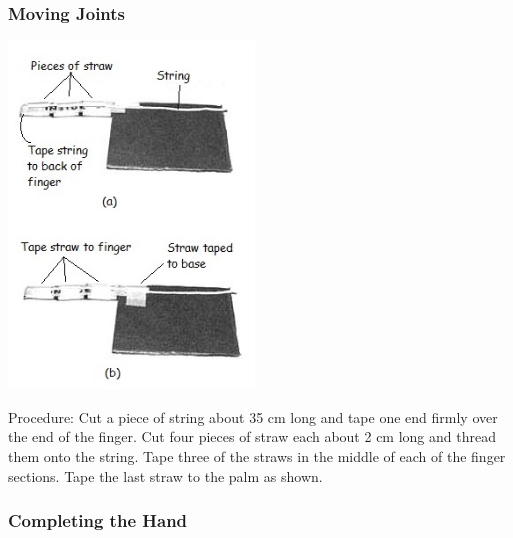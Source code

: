 \begin{multicols}{2}
\columnbreak

\subsubsection{Moving Joints}

\begin{center}
\includegraphics[width=0.49\textwidth]{./img/robotic-hand-4.jpg}
\end{center}

\begin{description*}
\item[Procedure:]{Cut a piece of string about 35 cm long and tape one end firmly over the end of
the finger. Cut four pieces of straw each about 2 cm long and thread them onto the string. Tape three of the straws in the middle of each of the finger sections. Tape the last straw to the palm as shown. }
\end{description*}

\subsubsection{Completing the Hand}


\end{multicols}
